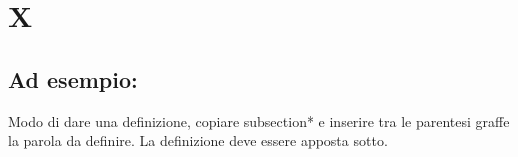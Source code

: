 \section*{X}
\markright{}
\subsection*{Ad esempio:}
Modo di dare una definizione, copiare subsection*{} e inserire tra le parentesi graffe la parola da definire. La definizione deve essere apposta sotto.